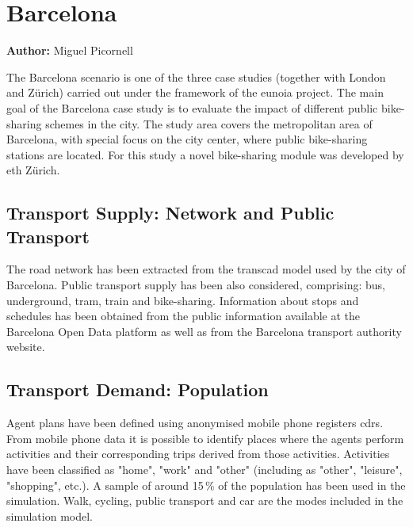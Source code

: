 \section{Barcelona}
\label{sec:barcelona}
\hfill \textbf{Author:} Miguel Picornell

The Barcelona scenario is one of the three case studies (together with London and Zürich) carried out under the framework of the \gls{eunoia} project. The main goal of the Barcelona case study is to evaluate the impact of different public bike-sharing schemes in the city. The study area covers the metropolitan area of Barcelona, with special focus on the city center, where public bike-sharing stations are located. For this study a novel bike-sharing module was developed by \gls{eth} Zürich.

\subsection{Transport Supply: Network and Public Transport}
The road network has been extracted from the \gls{transcad} model used by the city of Barcelona. Public transport supply has been also considered, comprising: bus, underground, tram, train and bike-sharing. Information about stops and schedules has been obtained from the public information available at the Barcelona Open Data platform as well as from the Barcelona transport authority website. 

\subsection{Transport Demand: Population} 
Agent plans have been defined using anonymised mobile phone registers \glspl{cdr}. From mobile phone data it is possible to identify places where the agents perform activities and their corresponding trips derived from those activities. Activities have been classified as "home", "work" and "other" (including as "other", "leisure", "shopping", etc.). A sample of around 15\,\% of the population has been used in the simulation. Walk, cycling, public transport and car are the modes included in the simulation model.

